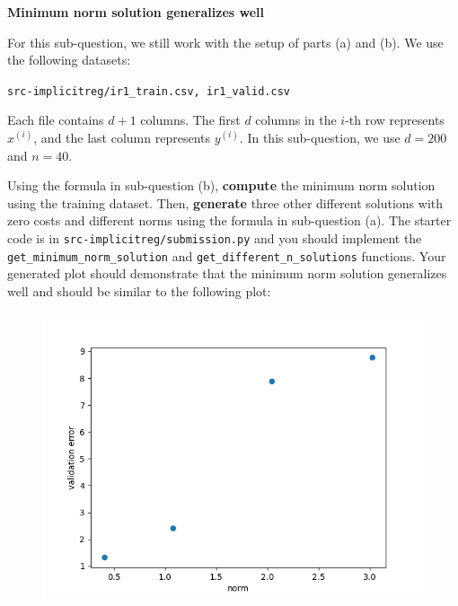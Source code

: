 \item {} \textbf{Minimum norm solution generalizes well}

For this sub-question, we still work with the setup of parts (a) and (b). We use the following datasets:
\begin{center}
	\texttt{src-implicitreg/ir1\_train.csv, ir1\_valid.csv}
\end{center}
Each file contains $d+1$ columns. The first $d$ columns in the $i$-th row represents $x^{(i)}$, and the last column represents $y^{(i)}.$ In this sub-question, we use $d=200$ and $n=40$.

Using the formula in sub-question (b), \textbf{compute} the minimum norm solution using the training dataset. Then, \textbf{generate} three other different solutions with zero costs and different norms using the formula in sub-question (a).
The starter code is in \texttt{src-implicitreg/submission.py} and you should implement the \texttt{get\_minimum\_norm\_solution} and \texttt{get\_different\_n\_solutions} functions.  
Your generated plot should demonstrate that the minimum norm solution generalizes well and should be similar to the following plot:

\begin{figure}[H]
	\centering
	\includegraphics[width=.5\linewidth]{04-implicitreg/implicitreg_linear.png}
\end{figure}